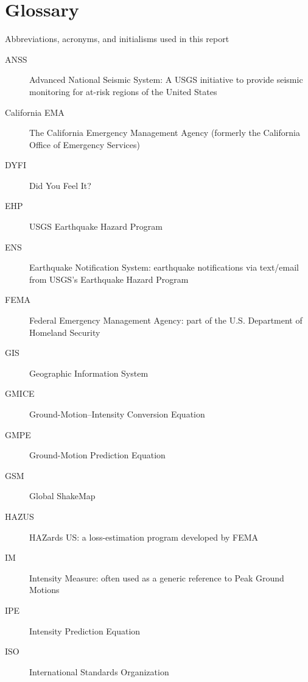 \documentclass[letterpaper,10pt,english]{sphinxmanual}
\begin{document}
\chapter{Glossary}
\label{glossary::doc}\label{glossary:glossary}
Abbreviations, acronyms, and initialisms used in this report
\begin{description}
\item[{ANSS}] \leavevmode
Advanced National Seismic System: A USGS initiative to provide seismic monitoring for at-risk
regions of the United States

\item[{California EMA}] \leavevmode
The California Emergency Management Agency (formerly the California Office of Emergency Services)

\item[{DYFI}] \leavevmode
Did You Feel It?

\item[{EHP}] \leavevmode
USGS Earthquake Hazard Program

\item[{ENS}] \leavevmode
Earthquake Notification System: earthquake notifications via text/email from USGS’s Earthquake Hazard Program

\item[{FEMA}] \leavevmode
Federal Emergency Management Agency: part of the U.S. Department of Homeland Security

\item[{GIS}] \leavevmode
Geographic Information System

\item[{GMICE}] \leavevmode
Ground-Motion--Intensity Conversion Equation

\item[{GMPE}] \leavevmode
Ground-Motion Prediction Equation

\item[{GSM}] \leavevmode
Global ShakeMap

\item[{HAZUS}] \leavevmode
HAZards US: a loss-estimation program developed by FEMA

\item[{IM}] \leavevmode
Intensity Measure: often used as a generic reference to Peak Ground Motions

\item[{IPE}] \leavevmode
Intensity Prediction Equation

\item[{ISO}] \leavevmode
International Standards Organization


\end{description}
\end{document}
